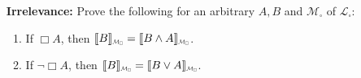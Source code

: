 \documentclass[a4paper, 11pt]{article} %
\newcommand{\interpret}[1]{\llbracket#1\rrbracket} %
\renewcommand{\L}[0]{\mathcal{L}}
\newcommand*{\Scale}[2][4]{\scalebox{#1}{$#2$}}%
\begin{document}
\begin{enumerate}[leftmargin=1.2in,labelsep=.15in]
\begin{enumerate}[label=(\arabic*),resume]
	\end{enumerate}
\item[\bf Irrelevance:] Prove the following for an arbitrary $A,B$ and $\mathcal{M}_\square$ of $\L_\square$: 
	\begin{enumerate}[label=(\arabic*),resume]\small
	\item If $\Box A$, then $\interpret{B}_{\Scale[0.5]{\mathcal{M}_\square}}=\interpret{B\wedge A}_{\Scale[0.5]{\mathcal{M}_\square}}$.
	\item If $\neg\Box A$, then $\interpret{B}_{\Scale[0.5]{\mathcal{M}_\square}}=\interpret{B\vee A}_{\Scale[0.5]{\mathcal{M}_\square}}$.
	\end{enumerate}
\end{enumerate}


\vfill








\begin{small} %
\singlespacing %
\setlength{\bibsep}{0.5pt} %
\thispagestyle{empty} %
\end{small} %
\end{document}
